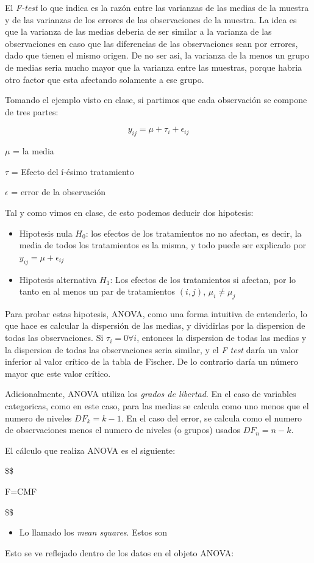 \documentclass[]{article}
\providecommand{\tightlist}{%
  \setlength{\itemsep}{0pt}\setlength{\parskip}{0pt}}
\begin{document}
El \emph{F-test} lo que indica es la razón entre las varianzas de las
medias de la muestra y de las varianzas de los errores de las
observaciones de la muestra. La idea es que la varianza de las medias
deberia de ser similar a la varianza de las observaciones en caso que
las diferencias de las observaciones sean por errores, dado que tienen
el mismo origen. De no ser asi, la varianza de la menos un grupo de
medias seria mucho mayor que la varianza entre las muestras, porque
habria otro factor que esta afectando solamente a ese grupo.

Tomando el ejemplo visto en clase, si partimos que cada observación se
compone de tres partes:

\[ y_{ij} = \mu + \tau_i + \epsilon_{ij} \]

\(\mu\) = la media

\(\tau\) = Efecto del í-ésimo tratamiento

\(\epsilon\) = error de la observación

Tal y como vimos en clase, de esto podemos deducir dos hipotesis:

\begin{itemize}
\tightlist
\item
  Hipotesis nula \(H_0\): los efectos de los tratamientos no no afectan,
  es decir, la media de todos los tratamientos es la misma, y todo puede
  ser explicado por \(y_{ij} = \mu + \epsilon_{ij}\)
\item
  Hipotesis alternativa \(H_1\): Los efectos de los tratamientos si
  afectan, por lo tanto en al menos un par de tratamientos \((i,j)\),
  \(\mu_i \neq \mu_j\)
\end{itemize}

Para probar estas hipotesis, ANOVA, como una forma intuitiva de
entenderlo, lo que hace es calcular la dispersión de las medias, y
dividirlas por la dispersion de todas las observaciones. Si
\(\tau_i=0 \forall i\), entonces la dispersion de todas las medias y la
dispersion de todas las observaciones seria similar, y el \emph{F test}
daría un valor inferior al valor crítico de la tabla de Fischer. De lo
contrario daría un número mayor que este valor crítico.

Adicionalmente, ANOVA utiliza los \emph{grados de libertad}. En el caso
de variables categoricas, como en este caso, para las medias se calcula
como uno menos que el numero de niveles \(DF_k=k-1\). En el caso del
error, se calcula como el numero de observaciones menos el numero de
niveles (o grupos) usados \(DF_n=n-k\).

El cálculo que realiza ANOVA es el siguiente:

\$\$

F=CMF

\$\$

\begin{itemize}
\tightlist
\item
  Lo llamado los \emph{mean squares}. Estos son
\end{itemize}

Esto se ve reflejado dentro de los datos en el objeto ANOVA:
\end{document}
